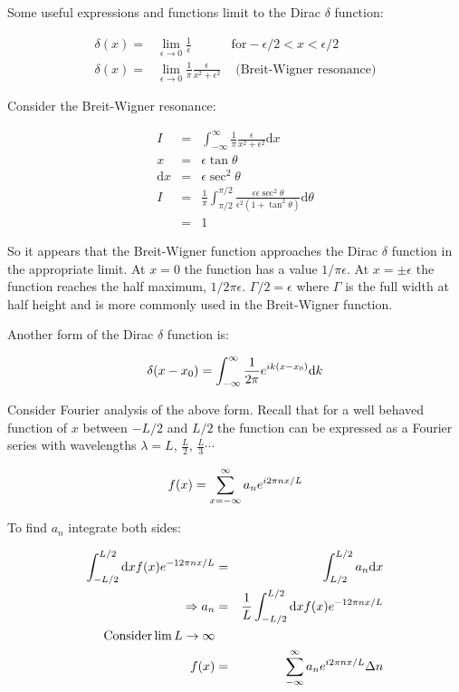 Some useful expressions and functions limit to the Dirac $\delta$ function:

\begin{eqnarray*}
  \delta(x) = & \displaystyle\lim_{\epsilon \to 0} \frac{1}{\epsilon} & \mathrm{ for } -\epsilon/2 < x < \epsilon/2 \\
  \delta(x) = & \displaystyle\lim_{\epsilon \to 0} \frac{1}{\pi}\frac{\epsilon}{x^2 + \epsilon^2} & \textrm{ (Breit-Wigner resonance)}
\end{eqnarray*}

Consider the Breit-Wigner resonance:

\begin{eqnarray*}
  I & = & \int_{-\infty}^{\infty} \frac{1}{\pi}\frac{\epsilon}{x^2 + \epsilon^2}\mathrm{d}x \\
  x & = & \epsilon \tan \theta \\
  \mathrm{d}x & = & \epsilon \sec^2\theta \\
  I & = & \frac{1}{\pi}\int_{\pi/2}^{\pi/2}\frac{\epsilon\epsilon\sec^2\theta}{\epsilon^2(1 + \tan^2\theta)}\mathrm{d}\theta \\
    & = & 1
\end{eqnarray*}

So it appears that the Breit-Wigner function approaches the Dirac $\delta$ function in the appropriate limit.  At $x=0$ the function has a value $1/\pi\epsilon$.  At $x=\pm\epsilon$ the function reaches the half maximum, $1/2\pi\epsilon$.  $\Gamma/2 = \epsilon$ where $\Gamma$ is the full width at half height and is more commonly used in the Breit-Wigner function.

Another form of the Dirac $\delta$ function is:

\[
  \delta(x-x_0) = \int_{-\infty}^{\infty} \frac{1}{2\pi} e^{ik(x-x_0)} \mathrm{d}k
\]

Consider Fourier analysis of the above form.  Recall that for a well behaved function of $x$ between $-L/2$ and $L/2$ the function can be expressed as a Fourier series with wavelengths $\lambda = L$, $\frac{L}{2}$, $\frac{L}{3} \cdots$

\[
  f(x) = \displaystyle\sum^{\infty}_{x=-\infty}a_ne^{i2\pi nx/L}
\]

To find $a_n$ integrate both sides:

\begin{eqnarray*}
  \int_{-L/2}^{L/2}\mathrm{d}xf(x)e^{-12\pi nx/L} & = & \int_{L/2}^{L/2}a_n \mathrm{d}x \\
  \Rightarrow a_n & = & \frac{1}{L} \int_{-L/2}^{L/2}\mathrm{d}xf(x) e^{-12\pi nx/L} \\
  \mathrm{Consider } \lim L\to \infty \\
  f(x) & = & \displaystyle\sum_{-\infty}^{\infty}a_n e^{i2\pi nx/L}\Delta n \\
\end{eqnarray*}

